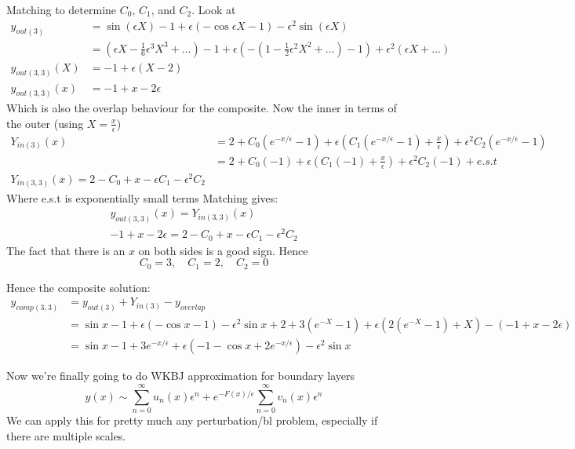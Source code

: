 \documentclass{X:/Documents/Coding/Latex/myassignment}
\begin{document}
Matching to determine $C_0$, $C_1$, and $C_2$. Look at 
\begin{align*}
    y_{out(3)} &= \sin(\epsilon X) - 1 +\epsilon(-\cos \epsilon X - 1) - \epsilon^2 \sin(\epsilon X)\\
    &=\left(\epsilon X - \frac16 \epsilon^3 X^3 + \hdots\right) - 1 +\epsilon\left(-\left(1 - \frac12 \epsilon^2 X^2 + \hdots\right) -1 \right) + \epsilon^2(\epsilon X +\hdots) \\
    y_{out(3,3)}(X) &= -1 + \epsilon (X-2)\\
    y_{out(3,3)}(x) &= -1 + x - 2\epsilon
\end{align*}
Which is also the overlap behaviour for the composite.
Now the inner in terms of the outer (using $X = \frac{x}{\epsilon}$)
\begin{align*}
    Y_{in(3)}(x) &= 2 + C_0(e^{-x/\epsilon} -1) + \epsilon (C_1 (e^{-x/\epsilon} -1) +\frac{x}{\epsilon}) + \epsilon^2 C_2 (e^{-x/\epsilon} -1)\\
    &= 2 + C_0( -1) + \epsilon (C_1 (-1) +\frac{x}{\epsilon}) + \epsilon^2 C_2 (-1) + e.s.t\\
    Y_{in(3,3)}(x) = 2 - C_0 + x - \epsilon C_1 - \epsilon^2 C_2
\end{align*}
Where e.s.t is exponentially small terms
Matching gives:
\begin{align*}
    y_{out(3,3)}(x) = Y_{in(3,3)}(x)\\
    -1 + x - 2\epsilon = 2 - C_0 + x - \epsilon C_1 - \epsilon^2 C_2
\end{align*}
The fact that there is an $x$ on both sides is a good sign.
Hence
\[C_0 = 3, \quad C_1 = 2, \quad C_2 = 0\]

Hence the composite solution:
\begin{align*}
    y_{comp(3,3)} &= y_{out(3)} + Y_{in(3)} - y_{overlap}\\
    &= \sin x -1 + \epsilon(-\cos x - 1) - \epsilon^2 \sin x + 2 + 3(e^{-X} -1) + \epsilon(2(e^{-X} -1) + X) - (-1+x - 2\epsilon)\\
    &= \sin x -1 + 3e^{-x/\epsilon} + \epsilon(-1 - \cos x + 2e^{-x/\epsilon}) - \epsilon^2 \sin x
\end{align*}

Now we're finally going to do WKBJ approximation for boundary layers
\[y(x) \sim \sum_{n=0}^\infty u_n (x) \epsilon^n + e^{-F(x)/\epsilon}\sum_{n=0}^\infty v_n(x)\epsilon^n\]
We can apply this for pretty much any perturbation/bl problem, especially if there are multiple scales.
\end{document}
